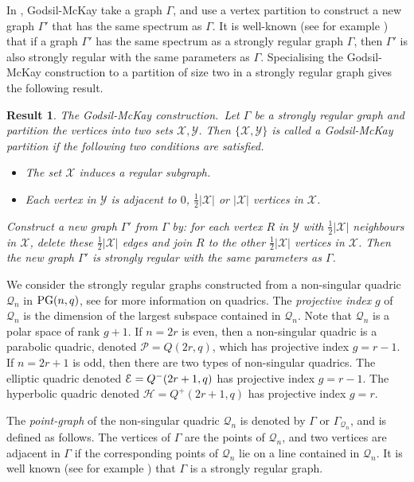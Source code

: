 \documentclass[12pt]{article}
\newtheorem{result}[theorem]{Result}
\newcommand{\X}{\mathcal X}
\newcommand{\Y}{\mathcal Y}
\newcommand\E{{\cal E}}
\renewcommand{\P}{\mathcal P}
\renewcommand{\H}{\mathcal H}
\newcommand{\Q}{\mathscr Q}
\newcommand\PG{{\rm PG}}
\newcommand{\Label}{\label}
\begin{document}
In \cite{godsil}, Godsil-McKay take a graph $\Gamma$,  and use a vertex partition to  construct a new graph $\Gamma'$ that has the same spectrum as $\Gamma$. It is well-known (see for example \cite{brouwer}) that if a graph $\Gamma'$ has the same spectrum as a strongly regular graph $\Gamma$, then $\Gamma'$ is also strongly regular with the same parameters as $\Gamma$. Specialising the Godsil-McKay construction  to a partition of size two in a strongly regular graph gives the following result. 

\begin{result}\Label{GMK} {\em The Godsil-McKay construction.}\ Let $\Gamma$ be a strongly regular graph and partition the vertices into two sets $\X,\Y$. Then $\{\X,\Y\}$ is called  a {\em Godsil-McKay partition} if  the following two conditions are satisfied.
\begin{itemize}
\item[{\rm I.}] The set $\X$ induces a regular subgraph. 
\item[{\rm II.}] Each vertex in $\Y$ is adjacent to $0$, $\frac12|\X|$ or $|\X|$ vertices in $\X$. 
\end{itemize}
Construct  a new graph $\Gamma'$ from $\Gamma$ by: for each vertex $R$ in $\Y$ with $\frac12|\X|$ neighbours in $\X$, delete these $\frac12|\X|$ edges and join $R$ to the other $\frac12|\X|$ vertices in $\X$.
Then the new graph $\Gamma'$ is strongly regular with the same parameters as $\Gamma$. 
\end{result}


We consider the strongly regular graphs constructed  from a non-singular  quadric $\Q_n$ in $\PG(n,q)$, see \cite[Chapter 22]{HT} for more information on quadrics. The {\em projective index} $g$ of $\Q_n$ is the dimension of the largest subspace contained in $\Q_n$. Note that $\Q_n$ is a  polar space of rank $g+1$. If $n=2r$ is even, then a non-singular quadric is a parabolic quadric, denoted  $\P=Q(2r,q)$, which has projective index $g=r-1$.
If $n=2r+1$ is odd, then there are two types of non-singular quadrics. The elliptic quadric denoted $\E=Q^-(2r+1,q)$ has  projective index $g=r-1$. The hyperbolic quadric denoted $\H=Q^+(2r+1,q)$ has  projective index $g=r$. 

The {\em point-graph}  of  the non-singular  quadric $\Q_n$ is denoted by $\Gamma$ or $\Gamma_{\Q_n}$, and is defined as follows.  The vertices of $\Gamma$ are the points of $\Q_n$, and two vertices are adjacent  in $\Gamma$ if the corresponding points of $\Q_n$ lie on a line contained in  $\Q_n$. It is well known (see for example \cite{brouwer89}) that $\Gamma$ is a strongly regular graph. 
\end{document}
